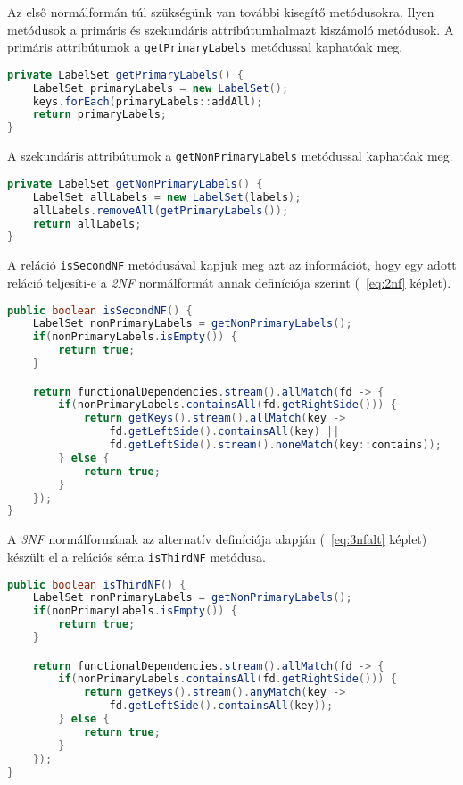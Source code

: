 Az első normálformán túl szükségünk van további kisegítő metódusokra. Ilyen metódusok a primáris és szekundáris attribútumhalmazt kiszámoló metódusok. A primáris attribútumok a \lstinline{getPrimaryLabels} metódussal kaphatóak meg.

\linespread{1}
\begin{lstlisting}[language=Java]
private LabelSet getPrimaryLabels() {
	LabelSet primaryLabels = new LabelSet();
	keys.forEach(primaryLabels::addAll);
	return primaryLabels;
}
\end{lstlisting}

A szekundáris attribútumok a \lstinline{getNonPrimaryLabels} metódussal kaphatóak meg.

\linespread{1}
\begin{lstlisting}[language=Java]
private LabelSet getNonPrimaryLabels() {
	LabelSet allLabels = new LabelSet(labels);
	allLabels.removeAll(getPrimaryLabels());
	return allLabels;
}
\end{lstlisting}

A reláció \lstinline{isSecondNF} metódusával kapjuk meg azt az információt, hogy egy adott reláció teljesíti-e a \textit{2NF} normálformát annak definíciója szerint (~\ref{eq:2nf} képlet).

\linespread{1}
\begin{lstlisting}[language=Java]
public boolean isSecondNF() {
	LabelSet nonPrimaryLabels = getNonPrimaryLabels();
	if(nonPrimaryLabels.isEmpty()) {
		return true;
	}

	return functionalDependencies.stream().allMatch(fd -> {
		if(nonPrimaryLabels.containsAll(fd.getRightSide())) {
			return getKeys().stream().allMatch(key -> 
				fd.getLeftSide().containsAll(key) || 
				fd.getLeftSide().stream().noneMatch(key::contains));
		} else {
			return true;
		}
	});
}
\end{lstlisting}

A \textit{3NF} normálformának az alternatív definíciója alapján (~\ref{eq:3nfalt} képlet) készült el a relációs séma \lstinline{isThirdNF} metódusa.

\linespread{1}
\begin{lstlisting}[language=Java]
public boolean isThirdNF() {
	LabelSet nonPrimaryLabels = getNonPrimaryLabels();
	if(nonPrimaryLabels.isEmpty()) {
		return true;
	}

	return functionalDependencies.stream().allMatch(fd -> {
		if(nonPrimaryLabels.containsAll(fd.getRightSide())) {
			return getKeys().stream().anyMatch(key -> 
				fd.getLeftSide().containsAll(key));
		} else {
			return true;
		}
	});
}
\end{lstlisting}

